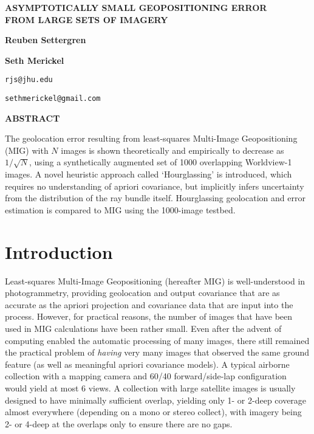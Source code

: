 \documentclass[10pt]{amsart}
\begin{document}
\title[Small Geopositioning Error from Many Images]{}
\author[Settergren]{}%
\author[Merickel]{}%
\maketitle


\vskip -1.1in

\begin{centering}
{\large \bf ASYMPTOTICALLY SMALL GEOPOSITIONING ERROR \\ FROM LARGE SETS OF IMAGERY}

\vspace \baselineskip

{\bf Reuben Settergren}

{\bf Seth Merickel}

{\tt rjs@jhu.edu}

{\tt sethmerickel@gmail.com}

\end{centering}

\vspace \baselineskip


{\noindent \large \bf ABSTRACT}
\vspace \baselineskip

\noindent The geolocation error resulting from least-squares Multi-Image Geopositioning
(MIG) with $N$ images is shown theoretically and empirically to decrease as
$1/\sqrt{N}$, using a synthetically augmented set of 1000 overlapping
Worldview-1 images. A novel heuristic approach called `Hourglassing' is
introduced, which requires no understanding of apriori covariance, but
implicitly infers uncertainty from the distribution of the ray bundle
itself. Hourglassing geolocation and error estimation is compared to MIG using
the 1000-image testbed.

\section{Introduction}
Least-squares Multi-Image Geopositioning (hereafter MIG) is well-under\-stood in
photogrammetry\cite{LSQRMIG}, providing geolocation and output covariance that
are as accurate as the apriori projection and covariance data that are input
into the process. However, for practical reasons, the number of images that have
been used in MIG calculations have been rather small. Even after the advent of
computing enabled the automatic processing of many images, there still remained
the practical problem of {\em having} very many images that observed the same
ground feature (as well as meaningful apriori covariance models). A typical
airborne collection with a mapping camera and 60/40 forward/side-lap
configuration would yield at most 6 views. A collection with large satellite
images is usually designed to have minimally sufficient overlap, yielding only
1- or 2-deep coverage almost everywhere (depending on a mono or stereo collect),
with imagery being 2- or 4-deep at the overlaps only to ensure there are no gaps.
\end{document}
